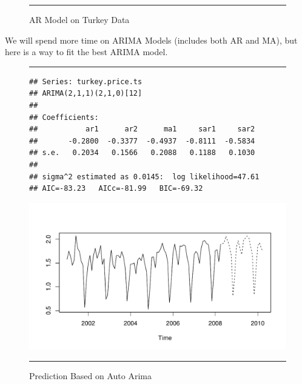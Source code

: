 \documentclass[11pt, letterpaper, twoside]{memoir}\usepackage{knitr}
\begin{document}
\begin{figure}
\begin{knitrout}
\end{knitrout}
\caption{AR Model on Turkey Data}
\label{Fig:arturkey}
\rule{4in}{1pt}
\end{figure}

We will spend more time on ARIMA Models (includes both AR and MA), but here is a way to fit the best ARIMA model.

\begin{figure}
\centering
\rule{4in}{1pt}
\begin{knitrout}
\color{fgcolor}\begin{kframe}
\begin{alltt}
 \hlkwb{<-} 
\end{alltt}
\begin{verbatim}
## Series: turkey.price.ts 
## ARIMA(2,1,1)(2,1,0)[12]                    
## 
## Coefficients:
##           ar1      ar2      ma1     sar1     sar2
##       -0.2800  -0.3377  -0.4937  -0.8111  -0.5834
## s.e.   0.2034   0.1566   0.2088   0.1188   0.1030
## 
## sigma^2 estimated as 0.0145:  log likelihood=47.61
## AIC=-83.23   AICc=-81.99   BIC=-69.32
\end{verbatim}
\begin{alltt}
 
                                  \hlstd{=} \hlstd{)}\hlopt{$} \hlstd{=}\hlstd{(}\hlopt{:}\hlstd{))}
\end{alltt}
\end{kframe}
\includegraphics[width=\maxwidth]{figure/unnamed-chunk-115-1} 

\end{knitrout}
\caption{Prediction Based on Auto Arima}
\label{Fig:parcorr}
\rule{4in}{1pt}
\end{figure}
\end{document}
